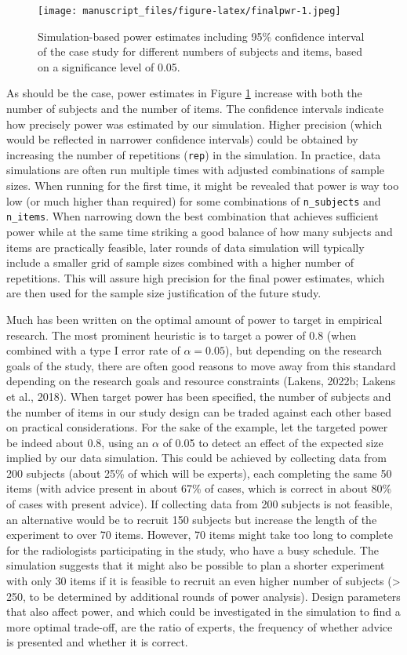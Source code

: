 \documentclass[
  man,floatsintext]{apa6}
\begin{document}
\begin{figure}
\centering
\texttt{[image: manuscript\_files/figure-latex/finalpwr-1.jpeg]}
\caption{\label{fig:finalpwr}Simulation-based power estimates including 95\% confidence interval of the case study for different numbers of subjects and items, based on a significance level of 0.05.}
\end{figure}

As should be the case, power estimates in Figure \ref{fig:finalpwr} increase with both the number of subjects and the number of items. The confidence intervals indicate how precisely power was estimated by our simulation. Higher precision (which would be reflected in narrower confidence intervals) could be obtained by increasing the number of repetitions (\texttt{rep}) in the simulation. In practice, data simulations are often run multiple times with adjusted combinations of sample sizes. When running for the first time, it might be revealed that power is way too low (or much higher than required) for some combinations of \texttt{n\_subjects} and \texttt{n\_items}. When narrowing down the best combination that achieves sufficient power while at the same time striking a good balance of how many subjects and items are practically feasible, later rounds of data simulation will typically include a smaller grid of sample sizes combined with a higher number of repetitions. This will assure high precision for the final power estimates, which are then used for the sample size justification of the future study.

Much has been written on the optimal amount of power to target in empirical research. The most prominent heuristic is to target a power of 0.8 (when combined with a type I error rate of \(\alpha = 0.05\)), but depending on the research goals of the study, there are often good reasons to move away from this standard depending on the research goals and resource constraints (Lakens, 2022b; Lakens et al., 2018). When target power has been specified, the number of subjects and the number of items in our study design can be traded against each other based on practical considerations. For the sake of the example, let the targeted power be indeed about 0.8, using an \(\alpha\) of 0.05 to detect an effect of the expected size implied by our data simulation. This could be achieved by collecting data from 200 subjects (about 25\% of which will be experts), each completing the same 50 items (with advice present in about 67\% of cases, which is correct in about 80\% of cases with present advice). If collecting data from 200 subjects is not feasible, an alternative would be to recruit 150 subjects but increase the length of the experiment to over 70 items. However, 70 items might take too long to complete for the radiologists participating in the study, who have a busy schedule. The simulation suggests that it might also be possible to plan a shorter experiment with only 30 items if it is feasible to recruit an even higher number of subjects (\textgreater{} 250, to be determined by additional rounds of power analysis). Design parameters that also affect power, and which could be investigated in the simulation to find a more optimal trade-off, are the ratio of experts, the frequency of whether advice is presented and whether it is correct.
\end{document}
